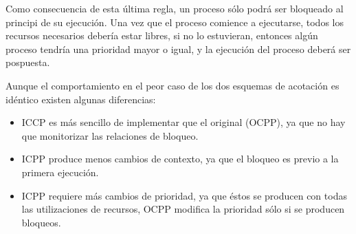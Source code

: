 Como consecuencia de esta última regla, un proceso sólo podrá ser bloqueado al
principi de su ejecución. Una vez que el proceso comience a ejecutarse, todos
los recursos necesarios debería estar libres, si no lo estuvieran, entonces
algún proceso tendría una prioridad mayor o igual, y la ejecución del proceso
deberá ser pospuesta.

Aunque el comportamiento en el peor caso de los dos esquemas de acotación es
idéntico existen algunas diferencias:

\begin{itemize}
	\item ICCP es más sencillo de implementar que el original (OCPP), ya que
		no hay que monitorizar las relaciones de bloqueo.
	\item ICPP produce menos cambios de contexto, ya que el bloqueo es
		previo a la primera ejecución.
	\item ICPP requiere más cambios de prioridad, ya que éstos se producen
		con todas las utilizaciones de recursos, OCPP modifica la
		prioridad sólo si se producen bloqueos.
\end{itemize}
